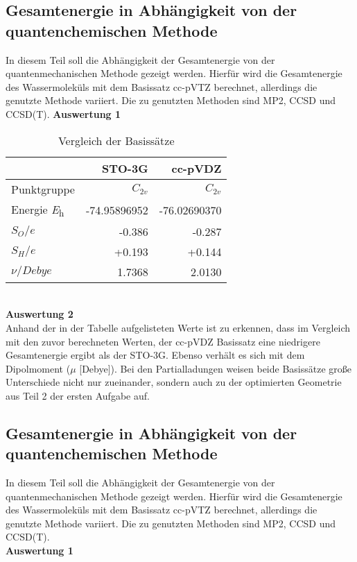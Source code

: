 \documentclass[12pt]{article}
\begin{document}
\begin{onehalfspace}
\subsection{Gesamtenergie in Abhängigkeit von der quantenchemischen Methode}
In diesem Teil soll die Abhängigkeit der Gesamtenergie von der quantenmechanischen Methode gezeigt werden. Hierfür wird die Gesamtenergie des Wassermoleküls mit dem Basissatz cc-pVTZ berechnet, allerdings die genutzte Methode variiert. Die zu genutzten Methoden sind MP2, CCSD und CCSD(T).
\newpage
\noindent
\textbf{Auswertung 1}\\
\begin{table}[!htpb]
\centering
\caption{Vergleich der Basissätze}
\begin{tabular}{lrr}
\toprule
 &
STO-3G &
cc-pVDZ \\
\midrule
Punktgruppe & $C _{2v}$ & $C _{2v}$\\
Energie \si{\hartree}    & -74.95896952 & -76.02690370  \\
$S _O / \textit{e}$ & -0.386 & -0.287  \\
$S _H / \textit{e}$ & +0.193 & +0.144  \\
$\nu / \textit{Debye}$ & 1.7368 & 2.0130  \\
\bottomrule
\end{tabular}
\end{table}\\
\textbf{Auswertung 2}\\
Anhand der in der Tabelle aufgelisteten Werte ist zu erkennen,
 dass im Vergleich mit den zuvor berechneten Werten, der cc-pVDZ Basissatz eine niedrigere Gesamtenergie ergibt als der STO-3G.
 Ebenso verhält es sich mit dem Dipolmoment ($\mu$ [Debye]). Bei den Partialladungen weisen beide Basissätze große Unterschiede
 nicht nur zueinander, sondern auch zu der optimierten Geometrie aus Teil 2 der ersten Aufgabe auf.
\subsection{Gesamtenergie in Abhängigkeit von der quantenchemischen Methode}
In diesem Teil soll die Abhängigkeit der Gesamtenergie von der quantenmechanischen Methode gezeigt werden.
Hierfür wird die Gesamtenergie des Wassermoleküls mit dem Basissatz cc-pVTZ berechnet, allerdings die genutzte Methode variiert.
Die zu genutzten Methoden sind MP2, CCSD und CCSD(T).\\
\textbf{Auswertung 1}\\


\end{onehalfspace}
\end{document}
